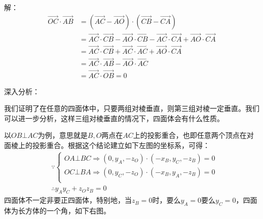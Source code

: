 解：
\begin{align*}
\overrightarrow{OC}\cdot \overrightarrow{AB}&=\left( \overrightarrow{AC}-\overrightarrow{AO} \right) \cdot \left( \overrightarrow{CB}-\overrightarrow{CA} \right) \\
&=\overrightarrow{AC}\cdot \overrightarrow{CB}-\overrightarrow{AO}\cdot \overrightarrow{CB}-\overrightarrow{AC}\cdot \overrightarrow{CA}+\overrightarrow{AO}\cdot \overrightarrow{CA} \\
&=\overrightarrow{AC}\cdot \overrightarrow{CB}+\overrightarrow{AC}\cdot \overrightarrow{AC}+\overrightarrow{AO}\cdot \overrightarrow{CA} \\
&=\overrightarrow{AC}\cdot \overrightarrow{AB}-\overrightarrow{AO}\cdot \overrightarrow{AC} \\
&=\overrightarrow{AC}\cdot \overrightarrow{OB}=0
\end{align*}

深入分析：

我们证明了在任意的四面体中，只要两组对棱垂直，则第三组对棱一定垂直。我们可以进一步分析，这样三组对棱垂直的情况下，四面体会有什么性质。

以$OB\bot AC$为例，意思就是$B,O$两点在$AC$上的投影重合，也即任意两个顶点在对面棱上的投影重合。根据这个结论建立如下左图的坐标系，可得：
\begin{align*}
&\because \begin{cases}
	OA\bot BC\Rightarrow \left( 0,y_A,-z_O \right) \cdot \left( -x_B,y_C,-z_B \right) =0\\
	OC\bot BA\Rightarrow \left( 0,y_C,-z_O \right) \cdot \left( -x_B,y_A,-z_B \right) =0\\
\end{cases} \\
&\therefore y_Ay_C+z_Oz_B=0
\end{align*}
四面体不一定非要正四面体，特别地，当$z_B=0$时，要么$y_A=0$要么$y_C=0$，四面体为长方体的一个角，如下右图。

